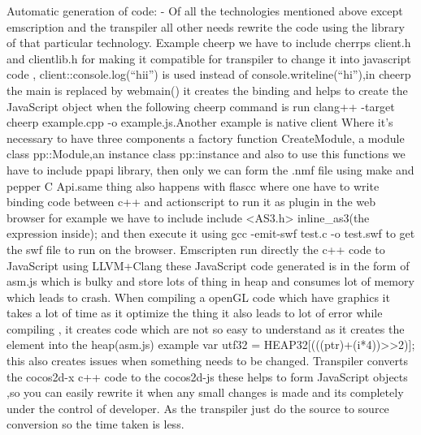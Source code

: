 \documentclass[23pt]{article}
\begin{document}
{\Large Automatic generation of code: - Of all the technologies mentioned above except emscription and the transpiler all other needs rewrite the code using the library of that particular technology.
Example cheerp we have to include cherrps client.h and clientlib.h for making it compatible for  transpiler to change it into javascript code ,  client::console.log(“hii”) is used instead of console.writeline(“hi”),in cheerp the main is replaced by webmain() it creates the binding and helps to create the JavaScript object when the following cheerp command is run clang++ -target cheerp example.cpp -o example.js.Another example is native client 
Where it’s necessary to have three components a factory function CreateModule, a module class pp::Module,an instance class pp::instance and also to use this functions we have to include ppapi library, then only we can form the .nmf file using make and pepper C Api.same thing also happens with flascc where one have to write binding code between c++ and actionscript to run it as plugin in the web browser for example we have to include  include <AS3.h> inline\_as3(the expression inside); and then execute it using gcc -emit-swf test.c -o test.swf to get the swf file to run on the browser.  Emscripten run directly the c++ code to JavaScript using LLVM+Clang these JavaScript code generated is in the form of asm.js which is bulky and store lots of thing in heap and consumes lot of memory which leads to crash. When compiling a openGL code which have graphics it takes a lot of time as it optimize the thing it also leads to lot of error while compiling , it creates code which are not so easy to understand as it creates the element into the heap(asm.js)  example  var utf32 = HEAP32[(((ptr)+(i*4))>>2)];  this also creates issues when something needs to be changed. Transpiler converts the cocos2d-x c++ code to the cocos2d-js these helps to form JavaScript objects ,so you can easily rewrite it when any small changes is made and its completely under the control of developer. As the transpiler just do the source to source conversion so the time taken is less. \\
}
\end{document}
